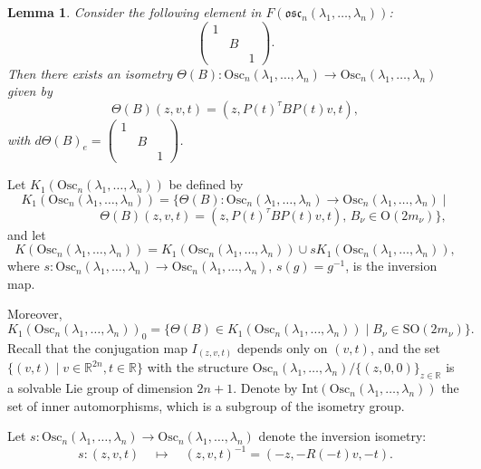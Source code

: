 \documentclass[12pt]{amsart}
\theoremstyle{plain}
\newtheorem{lem}[thm]{Lemma}
\theoremstyle{definition}
\theoremstyle{remark}
\begin{document}
\begin{lem}
    Consider the following element in \( F(\mathfrak{osc}_n(\lambda_1, \ldots, \lambda_n)) \):
    \[
    \left( \begin{matrix}
    1 & & \\
    & B & \\
    & & 1
    \end{matrix} \right).
    \]
    Then there exists an isometry \( \Theta(B): \text{Osc}_n(\lambda_1, \ldots, \lambda_n) \to \text{Osc}_n(\lambda_1, \ldots, \lambda_n) \) given by
    \[
    \Theta(B)(z, v, t) = (z, P(t)^{\tau} B P(t) v, t),
    \]
    with \( d \Theta(B)_e = \left( \begin{matrix}
    1 & & \\
    & B & \\
    & & 1
    \end{matrix} \right) \).
\end{lem}


Let \( K_1(\text{Osc}_n(\lambda_1, \ldots, \lambda_n)) \) be defined by
\[
K_1(\text{Osc}_n(\lambda_1, \ldots, \lambda_n)) = \{\Theta(B): \text{Osc}_n(\lambda_1, \ldots, \lambda_n) \to \text{Osc}_n(\lambda_1, \ldots, \lambda_n) \mid
\]
\[
\qquad \qquad \qquad \Theta(B)(z, v, t) = (z, P(t)^{\tau} B P(t) v, t), \, B_{\nu} \in \mathrm{O}(2m_{\nu})\},
\]
and let
\[
K(\text{Osc}_n(\lambda_1, \ldots, \lambda_n)) = K_1(\text{Osc}_n(\lambda_1, \ldots, \lambda_n)) \cup s K_1(\text{Osc}_n(\lambda_1, \ldots, \lambda_n)),
\]
where \( s: \text{Osc}_n(\lambda_1, \ldots, \lambda_n) \to \text{Osc}_n(\lambda_1, \ldots, \lambda_n) \), \( s(g) = g^{-1} \), is the inversion map.

Moreover,
\[
K_1(\text{Osc}_n(\lambda_1, \ldots, \lambda_n))_0 = \{\Theta(B) \in K_1(\text{Osc}_n(\lambda_1, \ldots, \lambda_n)) \mid B_{\nu} \in \mathrm{SO}(2m_{\nu})\}.
\]
Recall that the conjugation map \( I_{(z, v, t)} \) depends only on \( (v, t) \), and the set \( \{(v, t) \mid v \in \mathbb{R}^{2n}, t \in \mathbb{R}\} \) with the structure \( \text{Osc}_n(\lambda_1, \ldots, \lambda_n)/\{(z, 0, 0)\}_{z \in \mathbb{R}} \) is a solvable Lie group of dimension \( 2n+1 \). Denote by \( \text{Int}(\text{Osc}_n(\lambda_1, \ldots, \lambda_n)) \) the set of inner automorphisms, which is a subgroup of the isometry group.

Let \( s: \text{Osc}_n(\lambda_1, \ldots, \lambda_n) \to \text{Osc}_n(\lambda_1, \ldots, \lambda_n) \) denote the inversion isometry:
\[
s: (z, v, t) \quad \mapsto \quad (z, v, t)^{-1} = (-z, -R(-t)v, -t).
\]
\end{document}
